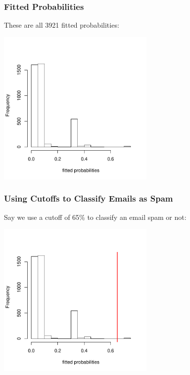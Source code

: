 \documentclass[handout]{beamer}
\newcommand{\blue}[1]{\textcolor{blue2}{#1}}
\begin{document}
\begin{frame}[fragile]
\frametitle{Fitted Probabilities}
These are all 3921 fitted probabilities:
\begin{center}
\includegraphics[width=3in]{figure/fitted.pdf}
\end{center}

\end{frame}


\begin{frame}[fragile]
\frametitle{Using Cutoffs to Classify Emails as Spam}

Say we use a cutoff of 65\% to \blue{classify} an email spam or not:
\begin{center}
\includegraphics[width=3in]{figure/fitted2.pdf}
\end{center}

\end{frame}
\end{document}

